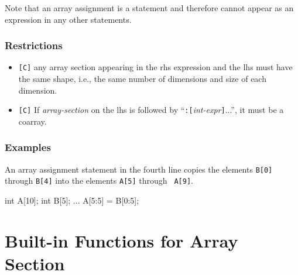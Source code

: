
Note that an array assignment is a statement and therefore cannot
appear as an expression in any other statements.

\subsubsection*{Restrictions}

\begin{itemize}
 \item \verb![C]! any array section appearing in the rhs expression and
	   the lhs must have the same shape, i.e., the same number of
	   dimensions and size of each dimension.
 \item \verb![C]! If {\it array-section} on the lhs is followed by
       ``{\tt :}{\tt [}{\it int-expr}{\tt ]}...'', it must be a coarray.
\end{itemize}

\subsubsection*{Examples}

An array assignment statement in the fourth line copies the elements
{\tt B[0]} through {\tt B[4]} into the elements {\tt A[5]} through {\tt
A[9]}.

\hspace{\hsize}
\begin{XCexample}
int A[10];
int B[5];
    ...
A[5:5] = B[0:5]; 
\end{XCexample}


\section{Built-in Functions for Array Section}

